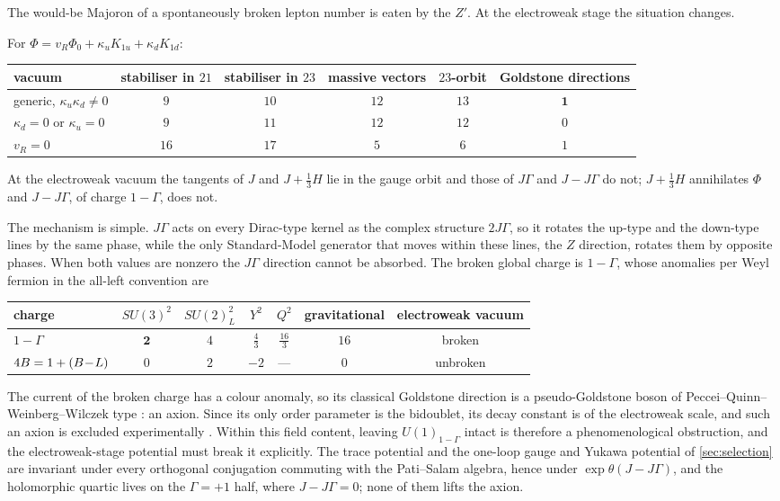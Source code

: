 The would-be Majoron of a spontaneously broken lepton number is eaten by the $Z'$. At the electroweak stage the situation changes.

\begin{theorem}
\label{thm:axion}
For $\Phi=v_R\Phi_0+\kappa_uK_{1u}+\kappa_dK_{1d}$:
\begin{center}
\small
\begin{tabular}{@{}lccccc@{}}
\toprule
vacuum & stabiliser in $21$ & stabiliser in $23$ & massive vectors & $23$-orbit & Goldstone directions\\
\midrule
generic, $\kappa_u\kappa_d\neq0$ & $9$ & $10$ & $12$ & $13$ & $\mathbf1$\\
$\kappa_d=0$ or $\kappa_u=0$ & $9$ & $11$ & $12$ & $12$ & $0$\\
$v_R=0$ & $16$ & $17$ & $5$ & $6$ & $1$\\
\bottomrule
\end{tabular}
\end{center}
At the electroweak vacuum the tangents of $J$ and $J+\tfrac13H$ lie in the gauge orbit and those of $J\Gamma$ and $J-J\Gamma$ do not; $J+\tfrac13H$ annihilates $\Phi$
and $J-J\Gamma$, of charge $1-\Gamma$, does not.
\end{theorem}

The mechanism is simple. $J\Gamma$ acts on every Dirac-type kernel as the complex structure $2J\Gamma$, so it rotates the up-type and the down-type lines by the
same phase, while the only Standard-Model generator that moves within these lines, the $Z$ direction, rotates them by opposite phases. When both values are
nonzero the $J\Gamma$ direction cannot be absorbed. The broken global charge is $1-\Gamma$, whose anomalies per Weyl fermion in the all-left convention are
\begin{center}
\small
\begin{tabular}{@{}lcccccc@{}}
\toprule
charge & $SU(3)^2$ & $SU(2)_L^2$ & $Y^2$ & $Q^2$ & gravitational & electroweak vacuum\\
\midrule
$1-\Gamma$ & $\mathbf2$ & $4$ & $\tfrac43$ & $\tfrac{16}3$ & $16$ & broken\\
$4B=1+(B\!-\!L)$ & $0$ & $2$ & $-2$ & --- & $0$ & unbroken\\
\bottomrule
\end{tabular}
\end{center}
The current of the broken charge has a colour anomaly, so its classical Goldstone direction is a pseudo-Goldstone boson of Peccei--Quinn--Weinberg--Wilczek
type \cite{PecceiQuinn77,Weinberg78,Wilczek78}: an axion. Since its only order parameter is the bidoublet, its decay constant is of the electroweak scale, and such an
axion is excluded experimentally \cite{PDG}. Within this field content, leaving $U(1)_{1-\Gamma}$ intact is therefore a phenomenological obstruction, and the
electroweak-stage potential must break it explicitly. The trace potential and the one-loop gauge and Yukawa potential of \cref{sec:selection} are invariant
under every orthogonal conjugation commuting with the Pati--Salam algebra, hence under $\exp\theta(J-J\Gamma)$, and the holomorphic quartic lives on the
$\Gamma=+1$ half, where $J-J\Gamma=0$; none of them lifts the axion.

